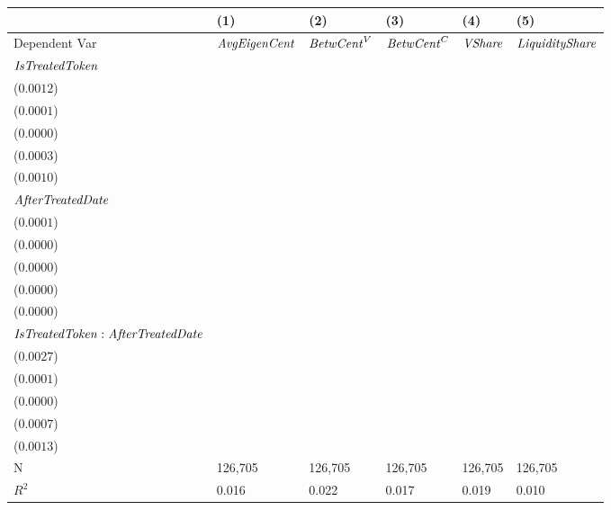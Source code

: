 \begin{tabular}{llllll}
\toprule
{} &                                      (1) &                                      (2) &                                      (3) &                                      (4) &                                      (5) \\
\midrule
Dependent Var                                 &                     ${\it AvgEigenCent}$ &                       ${\it BetwCent}^V$ &                       ${\it BetwCent}^C$ &                           ${\it VShare}$ &                   ${\it LiquidityShare}$ \\
${\it IsTreatedToken}$                        &  \makecell{$0.0125^{***}$ \\ ($0.0012$)} &  \makecell{$0.0003^{***}$ \\ ($0.0001$)} &  \makecell{$0.0001^{***}$ \\ ($0.0000$)} &  \makecell{$0.0035^{***}$ \\ ($0.0003$)} &  \makecell{$0.0087^{***}$ \\ ($0.0010$)} \\
${\it AfterTreatedDate}$                      &  \makecell{$0.0021^{***}$ \\ ($0.0001$)} &  \makecell{$0.0000^{***}$ \\ ($0.0000$)} &  \makecell{$0.0000^{***}$ \\ ($0.0000$)} &  \makecell{$0.0006^{***}$ \\ ($0.0000$)} &  \makecell{$0.0009^{***}$ \\ ($0.0000$)} \\
${\it IsTreatedToken}:{\it AfterTreatedDate}$ &   \makecell{$0.0059^{**}$ \\ ($0.0027$)} &     \makecell{$0.0000^{}$ \\ ($0.0001$)} &     \makecell{$0.0000^{}$ \\ ($0.0000$)} &   \makecell{$0.0015^{**}$ \\ ($0.0007$)} &    \makecell{$-0.0016^{}$ \\ ($0.0013$)} \\
\midrule N                                    &                                  126,705 &                                  126,705 &                                  126,705 &                                  126,705 &                                  126,705 \\
$R^2$                                         &                                    0.016 &                                    0.022 &                                    0.017 &                                    0.019 &                                    0.010 \\
\bottomrule
\end{tabular}
